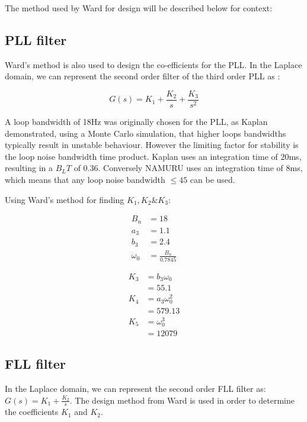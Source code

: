The method used by Ward for design will be described below for context: 


\subsection{\ac{PLL} filter}
Ward's method is also used to design the co-efficients for the \ac{PLL}. In the Laplace domain, we can represent the second order filter  of the third order \ac{PLL} as : 

\begin{equation} \label{eq6}
G(s) = K_1 + \frac{K_2}{s} + \frac{K_3}{s^2}
\end{equation}

A loop bandwidth of 18Hz was originally chosen for the \ac{PLL}, as Kaplan\cite{Kaplan} demonstrated, using a Monte Carlo simulation, that higher loops bandwidths typically result in unstable behaviour. However the limiting factor for stability is the loop noise bandwidth time product. Kaplan uses an integration time of 20ms, resulting in a $B_LT$ of 0.36. Conversely \ac{NAMURU} uses an integration time of 8ms, which means that any loop noise bandwidth $\leq 45$ can be used. 

Using Ward's method\cite{Ward} for finding $K_1,K_2 \& K_3$:

\begin{align*}
B_n &= 18\\
a_3&=1.1\\
b_3&=2.4\\
\omega_{0}&=\frac{B_n}{0.7845}
\end{align*}

\begin{align*} \label{eq3}
K_3 & = b_3 \omega_{0}\\
    & = 55.1\\
K_4 & = a_3 \omega_{0}^2\\ 
    & = 579.13\\
K_5 & = \omega_{0}^3\\
    & = 12079
\end{align*}


\subsection{\ac{FLL} filter}
In the Laplace domain, we can represent the second order \ac{FLL} filter as:  $G(s) = K_1 + \frac{K_2}{s}$. The design method from Ward \cite{Ward} is used in order to determine the coefficients $K_1$ and $K_2$.  

